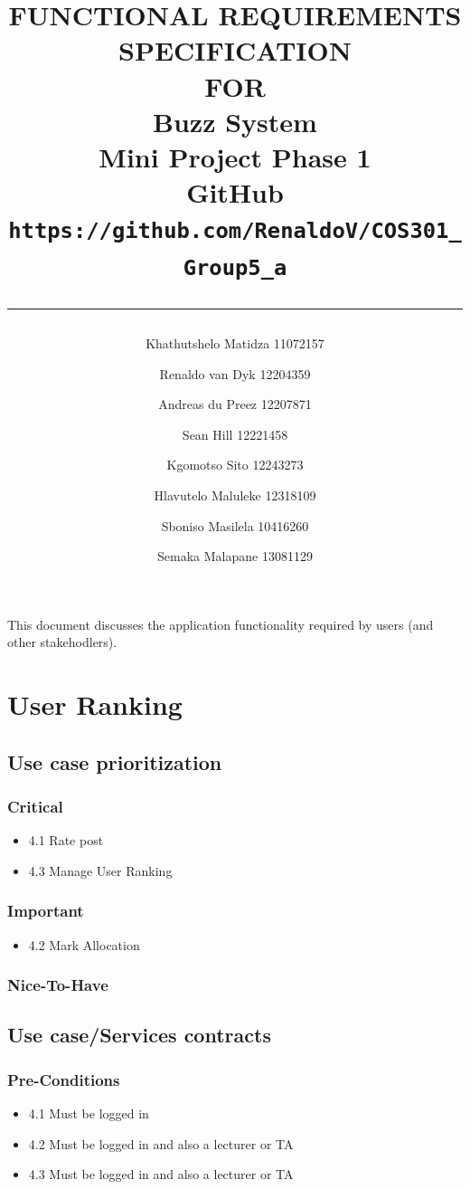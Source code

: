 \documentclass{scrreprt}
\title{%
\author{
Khathutshelo Matidza 11072157\\
\and
Renaldo van Dyk 12204359\\
\and
Andreas du Preez 12207871\\
\and
Sean Hill 12221458\\
\and
Kgomotso Sito 12243273\\
\and
Hlavutelo Maluleke 12318109\\
\and
Sboniso Masilela 10416260\\
\and
Semaka Malapane 13081129\\
}
\centering
\Huge{FUNCTIONAL REQUIREMENTS\\ SPECIFICATION}\\
\vspace{2cm}
FOR\\
\vspace{2cm}
Buzz System\\
\vspace{2cm}
Mini Project Phase 1\\
GitHub\\
\LARGE\texttt{https://github.com/RenaldoV/COS301\_Group5\_a}
\vfill
\vspace{1cm}
\rule{15cm}{3pt}
}
\date{}
\begin{document}
\maketitle
\tableofcontents

This document discusses the application functionality required by users (and other stakehodlers).\\
\chapter{User Ranking}
\section{Use case prioritization}
\subsection{Critical}
\begin{itemize}
  \item 4.1 Rate post
  \item 4.3 Manage User Ranking
\end{itemize}

\subsection{Important}
\begin{itemize}
  \item 4.2 Mark Allocation
\end{itemize}
\subsection{Nice-To-Have}


\section{Use case/Services contracts}
\subsection{Pre-Conditions}								%
\begin{itemize}
  \item 4.1 Must be logged in
  \item 4.2 Must be logged in and also a lecturer or TA
  \item 4.3 Must be logged in and also a lecturer or TA
\end{itemize}
\end{document}
